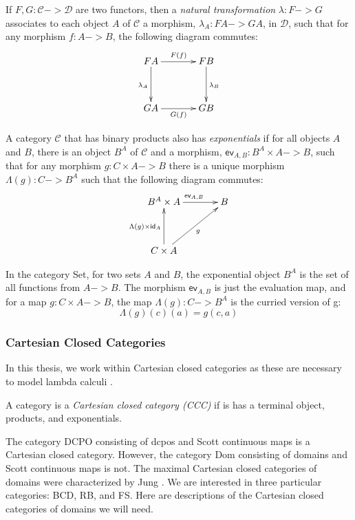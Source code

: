 \begin{definition}
If $F,G:\mathcal{C}->\mathcal{D}$ are two functors, then a \emph{natural transformation} $\lambda:F->G$ associates to each object $A$ of $\mathcal{C}$ a morphism, $\lambda_A:FA -> GA$, in $\mathcal{D}$, such that for any morphism $f:A->B$, the following diagram commutes:
\[
\xymatrix@+1pc{
FA\ar[r]^{F(f)}\ar[d]_{\lambda_A} & FB\ar[d]^{\lambda_B} \\
GA\ar[r]_{G(f)} & GB
}
\]

\end{definition}

\begin{definition}
A category $\mathcal{C}$ that has binary products also has \emph{exponentials} if for all objects $A$ and $B$, there is an object $B^A$ of $\mathcal{C}$ and a morphism, $\textsf{ev}_{A,B}:B^A \times A -> B$, such that for any morphism $g:C\times A->B$ there is a unique morphism $\Lambda(g):C-> B^A$ such that the following diagram commutes:
\[
\xymatrix@+1pc{
B^A \times A\ar[r]^{\textsf{ev}_{A,B}} & B \\
C \times A\ar[u]^{\Lambda(g)\times \textsf{id}_A}\ar[ur]_{g}
}
\]
\end{definition}

\begin{example}
In the category \textsf{Set}, for two sets $A$ and $B$, the exponential object $B^A$ is the set of all functions from $A->B$.  The morphism $\textsf{ev}_{A,B}$ is just the evaluation map, and for a map $g:C\times A -> B$, the map $\Lambda(g):C-> B^A$ is the curried version of g:
\[\Lambda(g)(c)(a) = g(c,a)\]
\end{example}

\subsubsection{Cartesian Closed Categories}

In this thesis, we work within Cartesian closed categories as these are necessary to model lambda calculi \cite{abramsky2011introduction}.

\begin{definition}
A category is a \emph{Cartesian closed category (CCC)} if is has a terminal object, products, and exponentials.
\end{definition}

The category \textsf{DCPO} consisting of dcpos and Scott continuous maps is a Cartesian closed category.  However, the category \textsf{Dom} consisting of domains and Scott continuous maps is not.  
The maximal Cartesian closed categories of domains were characterized by Jung \cite{jung1989cartesian}.  We are interested in three particular categories: \textsf{BCD}, \textsf{RB}, and \textsf{FS}.  Here are descriptions of the Cartesian closed categories of domains we will need. 

